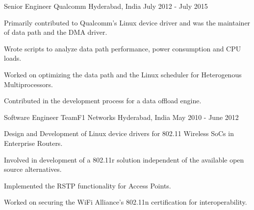 \begin{cventries}
  \cventry
    {Senior Engineer}
    {Qualcomm}
    {Hyderabad, India}
    {July 2012 - July 2015}
    {
     \begin{cvitems}
        \item{Primarily contributed to Qualcomm's Linux device
              driver and was the maintainer of data path and the DMA driver.}
        \item{Wrote scripts to analyze data path performance, power consumption and CPU loads.}
        \item{Worked on optimizing the data path and the Linux scheduler for Heterogenous Multiprocessors.}
        \item{Contributed in the development process for a data offload engine.}
      \end{cvitems}
    }
  \cventry
    {Software Engineer}
    {TeamF1 Networks}
    {Hyderabad, India}
    {May 2010 - June 2012}
    {
      \begin{cvitems}
        \item{Design and Development of Linux device drivers for 802.11 Wireless SoCs 
              in Enterprise Routers.}
        \item{Involved in development of a 802.11r solution independent of the available 
              open source alternatives.}
        \item{Implemented the RSTP functionality for Access Points.}
        \item{Worked on securing the WiFi Alliance's 802.11n certification for 
              interoperability.}
      \end{cvitems}
    }
\end{cventries}
